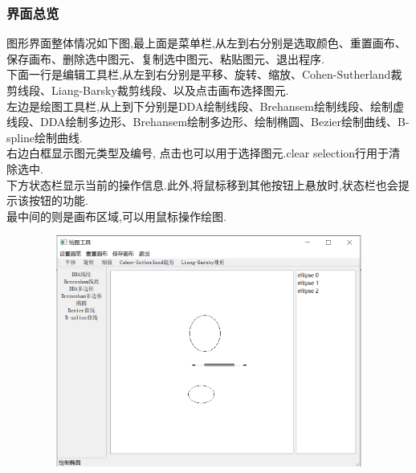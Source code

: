 \documentclass[a4paper,UTF8]{article}
\theoremstyle{definition}
\begin{document}
\subsubsection{界面总览}
图形界面整体情况如下图,最上面是菜单栏,从左到右分别是选取颜色、重置画布、保存画布、删除选中图元、复制选中图元、粘贴图元、退出程序.\\
\indent 下面一行是编辑工具栏,从左到右分别是平移、旋转、缩放、Cohen-Sutherland裁剪线段、Liang-Barsky裁剪线段、以及点击画布选择图元.\\
\indent 左边是绘图工具栏,从上到下分别是DDA绘制线段、Brehansem绘制线段、绘制虚线段、DDA绘制多边形、Brehansem绘制多边形、绘制椭圆、Bezier绘制曲线、B-spline绘制曲线.\\
\indent 右边白框显示图元类型及编号, 点击也可以用于选择图元.clear selection行用于清除选中.\\
\indent 下方状态栏显示当前的操作信息.此外,将鼠标移到其他按钮上悬放时,状态栏也会提示该按钮的功能.\\
\indent 最中间的则是画布区域,可以用鼠标操作绘图.
\begin{figure}[H]
	\includegraphics[width=5in,height=3in]{total.png}
\end{figure}
\end{document}
